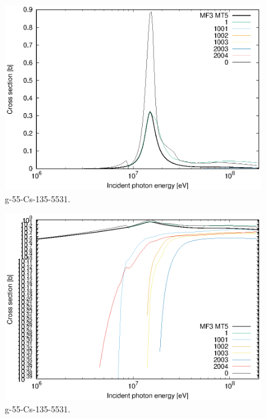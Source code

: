 \begin{figure}
 \includegraphics[width=\linewidth]{eps/g_55-Cs-135_5531.eps}
  \caption{g-55-Cs-135-5531.}
\end{figure}
\begin{figure}
 \includegraphics[width=\linewidth]{eps-log/g_55-Cs-135_5531.eps}
 \caption{g-55-Cs-135-5531.}
\end{figure}
\newpage \clearpage

